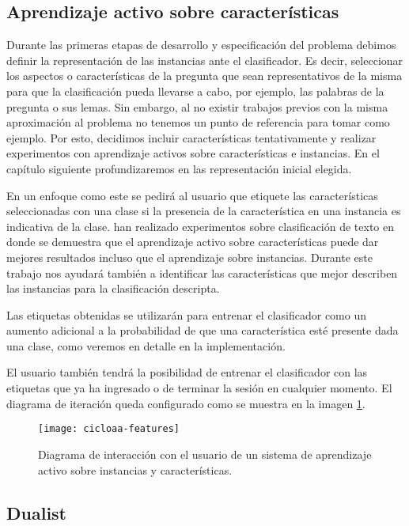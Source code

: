 \subsection{Aprendizaje activo sobre características}

Durante las primeras etapas de desarrollo y especificación del problema debimos definir la representación de las instancias ante el clasificador. Es decir, seleccionar los aspectos o características de la pregunta que sean representativos de la misma para que la clasificación pueda llevarse a cabo, por ejemplo, las palabras de la pregunta o sus lemas. Sin embargo, al no existir trabajos previos con la misma aproximación al problema no tenemos un punto de referencia para tomar como ejemplo. Por esto, decidimos incluir características tentativamente y realizar experimentos con aprendizaje activos sobre características e instancias. En el capítulo siguiente profundizaremos en las representación inicial elegida.

En un enfoque como este se pedirá al usuario que etiquete las características seleccionadas con una clase si la presencia de la característica en una instancia es indicativa de la clase. \citet{settles-al-features} han realizado experimentos sobre clasificación de texto en donde se demuestra que el aprendizaje activo sobre características puede dar mejores resultados incluso que el aprendizaje sobre instancias. Durante este trabajo nos ayudará también a identificar las características que mejor describen las instancias para la clasificación descripta.

Las etiquetas obtenidas se utilizarán para entrenar el clasificador como un aumento adicional a la probabilidad de que una característica esté presente dada una clase, como veremos en detalle en la implementación.

El usuario también tendrá la posibilidad de entrenar el clasificador con las etiquetas que ya ha ingresado o de terminar la sesión en cualquier momento. El diagrama de iteración queda configurado como se muestra en la imagen \ref{aa-features}.

\begin{figure}[h!]
\caption{Diagrama de interacción con el usuario de un sistema de aprendizaje activo sobre instancias y características.}\label{aa-features}
\texttt{[image: cicloaa-features]}
\centering
\end{figure}

\subsection{Dualist}

